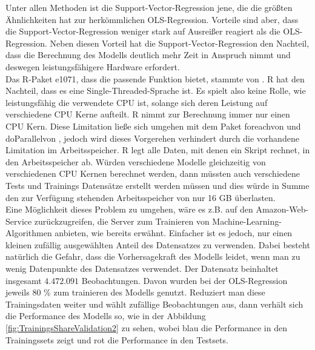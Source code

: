 \documentclass[a4paper,12pt]{thesis}
\begin{document}
Unter allen Methoden ist die Support-Vector-Regression jene, die die größten Ähnlichkeiten hat zur herkömmlichen OLS-Regression. Vorteile sind aber, dass die Support-Vector-Regression weniger stark auf Ausreißer reagiert als die OLS-Regression. Neben diesen Vorteil hat die Support-Vector-Regression den Nachteil, dass die Berechnung des Modells deutlich mehr Zeit in Anspruch nimmt und deswegen leistungsfähigere Hardware erfordert.\\
Das R-Paket \glqq e1071\grqq, dass die passende Funktion bietet, stammte von \cite{e10712021}. R hat den Nachteil, dass es eine Single-Threaded-Sprache ist. Es spielt also keine Rolle, wie leistungsfähig die verwendete CPU ist, solange sich deren Leistung auf verschiedene CPU Kerne aufteilt. R nimmt zur Berechnung immer nur einen CPU Kern. Diese Limitation ließe sich umgehen mit dem Paket \glqq foreach\grqq von \cite{foreach} und \glqq doParallel\grqq von \cite{doParallel}, jedoch wird dieses Vorgerehen verhindert durch die vorhandene Limitation im Arbeitsspeicher. R legt alle Daten, mit denen ein Skript rechnet, in den Arbeitsspeicher ab. Würden verschiedene Modelle gleichzeitig von verschiedenen CPU Kernen berechnet werden, dann müssten auch verschiedene Tests und Trainings Datensätze erstellt werden müssen und dies würde in Summe den zur Verfügung stehenden Arbeitsspeicher von nur 16 GB überlasten.\\
Eine Möglichkeit dieses Problem zu umgehen, wäre es z.B. auf den Amazon-Web-Service zurückzugreifen, die Server zum Trainieren von Machine-Learning-Algorithmen anbieten, wie bereits erwähnt. Einfacher ist es jedoch, nur einen kleinen zufällig ausgewählten Anteil des Datensatzes zu verwenden. Dabei besteht natürlich die Gefahr, dass die Vorhersagekraft des Modells leidet, wenn man zu wenig Datenpunkte des Datensatzes verwendet. Der Datensatz beinhaltet insgesamt $4.472.091$ Beobachtungen. Davon wurden bei der OLS-Regression jeweils 80 \% zum trainieren des Modells genutzt. Reduziert man diese Trainingsdaten weiter und wählt zufällige Beobachtungen aus, dann verhält sich die Performance des Modells so, wie in der Abbildung \ref{fig:TrainingsShareValidation2} zu sehen, wobei blau die Performance in den Trainingssets zeigt und rot die Performance in den Testsets.
\end{document}
